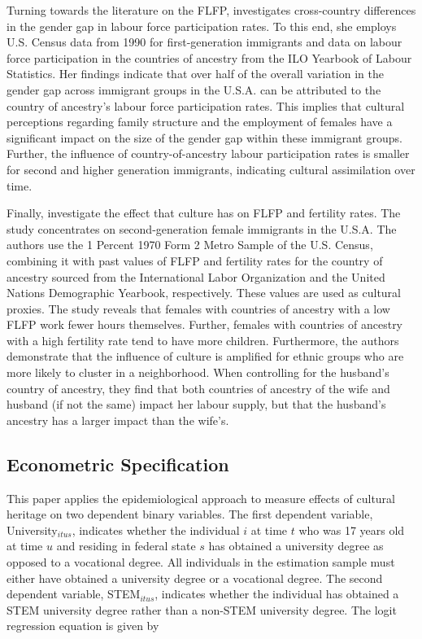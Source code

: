 \documentclass[a4paper, oneside, hyperfootnotes = false]{article}
\begin{document}
{Turning towards the literature on the FLFP, \cite{Antecol2000} investigates cross-country differences in the gender gap in labour force participation rates.
To this end, she employs U.S. Census data from 1990 for first-generation immigrants and data on labour force participation in the countries of ancestry from the ILO Yearbook of Labour Statistics.
Her findings indicate that over half of the overall variation in the gender gap across immigrant groups in the U.S.A. can be attributed to the country of ancestry's labour force participation rates.
This implies that cultural perceptions regarding family structure and the employment of females have a significant impact on the size of the gender gap within these immigrant groups.
Further, the influence of country-of-ancestry labour participation rates is smaller for second and higher generation immigrants, indicating cultural assimilation over time.

Finally, \cite{Fernandez2009} investigate the effect that culture has on FLFP and fertility rates.
The study concentrates on second-generation female immigrants in the U.S.A.
The authors use the 1 Percent 1970 Form 2 Metro Sample of the U.S. Census, combining it with past values of FLFP and fertility rates for the country of ancestry sourced from the International Labor Organization and the United Nations Demographic Yearbook, respectively.
These values are used as cultural proxies.
The study reveals that females with countries of ancestry with a low FLFP work fewer hours themselves.
Further, females with countries of ancestry with a high fertility rate tend to have more children.
Furthermore, the authors demonstrate that the influence of culture is amplified for ethnic groups who are more likely to cluster in a neighborhood.
When controlling for the husband's country of ancestry, they find that both countries of ancestry of the wife and husband (if not the same) impact her labour supply, but that the husband's ancestry has a larger impact than the wife's.

\subsection{Econometric Specification}
\label{specification}

This paper applies the epidemiological approach to measure effects of cultural heritage on two dependent binary variables.
The first dependent variable, University$_{itus}$, indicates whether the individual $i$ at time $t$ who was 17 years old at time $u$ and residing in federal state $s$ has obtained a university degree as opposed to a vocational degree.
All individuals in the estimation sample must either have obtained a university degree or a vocational degree.
The second dependent variable, STEM$_{itus}$, indicates whether the individual has obtained a STEM university degree rather than a non-STEM university degree.
The logit regression equation is given by

}
\end{document}

